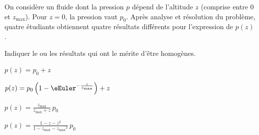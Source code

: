 


\finEntrainement



\hauteurLargeurCadreReponse		{7mm}{3.5cm}
\initialisationEntrainement

On considère un fluide dont la pression $p$ dépend de l'altitude $z$ (comprise entre $0$ et $z_{\text{max}}$). Pour $z=0$, la pression vaut $p_0$.
Après analyse et résolution du problème, quatre étudiants obtiennent quatre résultats différents pour l'expression de $p(z)$.

\debutEntrainement


\begin{enonce}
Indiquer le ou les résultats qui ont le mérite d'être homogènes.


	\begin{listeQCM1Colonne}
	\item $p(z) = p_0 + z$\smallskip
	\item $p(z) = p_0\left (1-\eEuler^{-\frac{z}{z_{\text{max}}}}\right ) + z$\smallskip
	\item $p(z) = \frac{z_{\text{max}}}{z_{\text{max}} + z}\, p_0$\smallskip
	\item $p(z) = \frac{1-z-z^2}{1-z_{\text{max}} - {{z_{\text{max}}}^2}}\, p_0$
	\end{listeQCM1Colonne}
	
\smallskip

\end{enonce}

